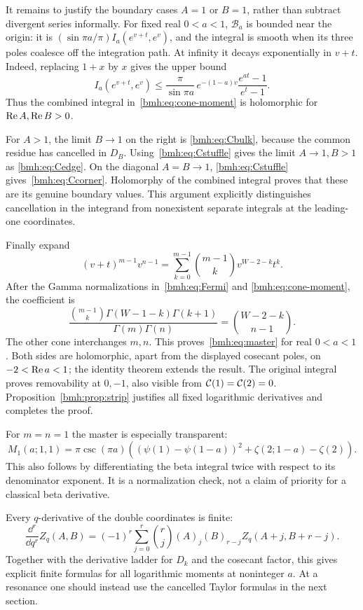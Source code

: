 It remains to justify the boundary cases $A=1$ or $B=1$, rather than
subtract divergent series informally. For fixed real $0<a<1$,
$\mathscr B_a$ is bounded near the origin: it is
$(\sin\pi a/\pi)I_a(e^{v+t},e^v)$, and the integral is smooth when its
three poles coalesce off the integration path. At infinity it decays
exponentially in $v+t$. Indeed, replacing $1+x$ by $x$ gives the upper
bound
\[
 I_a(e^{v+t},e^v)\le
 \frac\pi{\sin\pi a}\,e^{-(1-a)v}
       \frac{e^{at}-1}{e^t-1}.
\]
Thus the combined integral in~\eqref{bmh:eq:cone-moment} is holomorphic
for $\operatorname{Re} A,\operatorname{Re} B>0$.

For $A>1$, the limit $B\to1$ on the right is
\eqref{bmh:eq:Cbulk}, because the common residue has cancelled in
$D_B$. Using~\eqref{bmh:eq:Cstuffle} gives the limit $A\to1,B>1$ as
\eqref{bmh:eq:Cedge}. On the diagonal $A=B\to1$,
\eqref{bmh:eq:Cstuffle} gives~\eqref{bmh:eq:Ccorner}. Holomorphy of the
combined integral proves that these are its genuine boundary values.
This argument explicitly distinguishes cancellation in the integrand
from nonexistent separate integrals at the leading-one coordinates.

Finally expand
\[
 (v+t)^{m-1}v^{n-1}
 =\sum_{k=0}^{m-1}\binom{m-1}{k}
       v^{W-2-k}t^k.
\]
After the Gamma normalizations in~\eqref{bmh:eq:Fermi} and
\eqref{bmh:eq:cone-moment}, the coefficient is
\[
 \frac{\binom{m-1}{k}\Gamma(W-1-k)\Gamma(k+1)}
      {\Gamma(m)\Gamma(n)}
 =\binom{W-2-k}{n-1}.
\]
The other cone interchanges $m,n$. This proves~\eqref{bmh:eq:master}
for real $0<a<1$. Both sides are holomorphic, apart from the displayed
cosecant poles, on $-2<\operatorname{Re} a<1$; the identity theorem extends the result.
The original integral proves removability at $0,-1$, also visible from
$\mathcal C(1)=\mathcal C(2)=0$. Proposition~\ref{bmh:prop:strip} justifies all fixed
logarithmic derivatives and completes the proof.

\begin{example}\label{bmh:ex:11master}
For $m=n=1$ the master is especially transparent:
\begin{equation}\label{bmh:eq:11master}
 M_1(a;1,1)=\pi\csc(\pi a)
 \left((\psi(1)-\psi(1-a))^2+\zeta(2;1-a)-\zeta(2)\right).
\end{equation}
This also follows by differentiating the beta integral twice with respect
to its denominator exponent. It is a normalization check, not a claim of
priority for a classical beta derivative.
\end{example}

\begin{remark}
Every $q$-derivative of the double coordinates is finite:
\begin{equation}\label{bmh:eq:Zq-derivative}
 \frac{\dd^r}{\dd q^r}Z_q(A,B)=(-1)^r
 \sum_{j=0}^r\binom rj(A)_j(B)_{r-j}
       Z_q(A+j,B+r-j).
\end{equation}
Together with the derivative ladder for $D_k$ and the cosecant factor,
this gives explicit finite formulas for all logarithmic moments at
noninteger $a$. At a resonance one should instead use the cancelled
Taylor formulas in the next section.
\end{remark}
